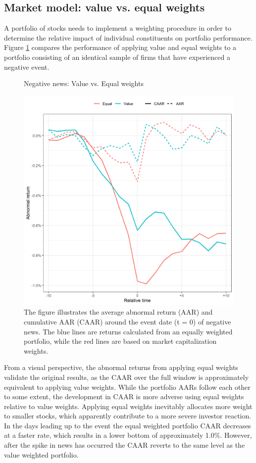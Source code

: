 \subsection{Market model: value vs. equal weights} \label{sec: sens_st_weights}

A portfolio of stocks needs to implement a weighting procedure in order to determine the relative impact of individual constituents on portfolio performance. Figure \ref{fig:ST_neg_sensitivity_weight} compares the performance of applying value and equal weights to a portfolio consisting of an identical sample of firms that have experienced a negative event. 

\begin{figure}[H]
    \centering
    \caption{Negative news: Value vs. Equal weights}
    \includegraphics[scale=0.6]{Projekt/1.Figures analysis/ST_negative_sensitivity_weight.png}
     \caption*{\footnotesize The figure illustrates the average abnormal return (AAR) and cumulative AAR (CAAR) around the event date (t = 0) of negative news. The blue lines are returns calculated from an equally weighted portfolio, while the red lines are based on market capitalization weights.}
    \label{fig:ST_neg_sensitivity_weight}
\end{figure} 

From a visual perspective, the abnormal returns from applying equal weights validate the original results, as the CAAR over the full window is approximately equivalent to applying value weights. While the portfolio AARs follow each other to some extent, the development in CAAR is more adverse using equal weights relative to value weights. Applying equal weights inevitably allocates more weight to smaller stocks, which apparently contribute to a more severe investor reaction. In the days leading up to the event the equal weighted portfolio CAAR decreases at a faster rate, which results in a lower bottom of approximately 1.0\%. However, after the spike in news has occurred the CAAR reverts to the same level as the value weighted portfolio. 

